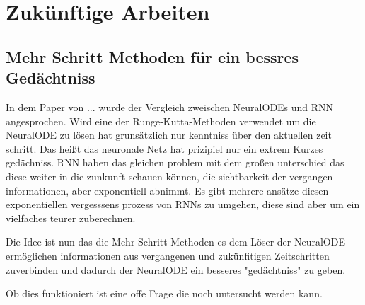 
\section{Zukünftige Arbeiten} \label{sec:future_work}

\subsection{Mehr Schritt Methoden für ein bessres Gedächtniss} \label{sec:better_memory}

In dem Paper von ... wurde der Vergleich zweischen NeuralODEs und RNN angesprochen.
Wird eine der Runge-Kutta-Methoden verwendet um die NeuralODE zu lösen hat grunsätzlich nur kenntniss
über den aktuellen zeit schritt.
Das heißt das neuronale Netz hat prizipiel nur ein extrem Kurzes gedächniss.
RNN haben das gleichen problem mit dem großen unterschied das diese weiter in die zunkunft schauen können, 
die sichtbarkeit der vergangen informationen, aber exponentiell abnimmt.
Es gibt mehrere ansätze diesen exponentiellen vergesssens prozess von RNNs zu umgehen, 
diese sind aber um ein vielfaches teurer zuberechnen.

Die Idee ist nun das die Mehr Schritt Methoden es dem Löser der NeuralODE ermöglichen informationen 
aus vergangenen und zukünfitigen Zeitschritten zuverbinden und dadurch der NeuralODE ein besseres 
"gedächtniss" zu geben.

Ob dies funktioniert ist eine offe Frage die noch untersucht werden kann.



